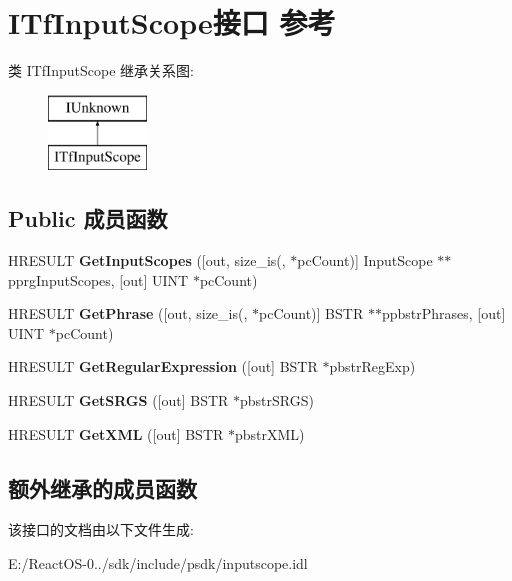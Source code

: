 \hypertarget{interface_i_tf_input_scope}{}\section{I\+Tf\+Input\+Scope接口 参考}
\label{interface_i_tf_input_scope}
类 I\+Tf\+Input\+Scope 继承关系图\+:\begin{figure}[H]
\begin{center}
\leavevmode
\includegraphics[height=2.000000cm]{interface_i_tf_input_scope}
\end{center}
\end{figure}
\subsection*{Public 成员函数}
\begin{DoxyCompactItemize}
\item 
\mbox{\label{interface_i_tf_input_scope_ad777bb9a64f50ede1b7e923455dd9a68}} 
H\+R\+E\+S\+U\+LT {\bfseries Get\+Input\+Scopes} (\mbox{[}out, size\+\_\+is(, $\ast$pc\+Count)\mbox{]} Input\+Scope $\ast$$\ast$pprg\+Input\+Scopes, \mbox{[}out\mbox{]} U\+I\+NT $\ast$pc\+Count)
\item 
\mbox{\label{interface_i_tf_input_scope_a289c68a7cc541294b43d8c1a797daa0d}} 
H\+R\+E\+S\+U\+LT {\bfseries Get\+Phrase} (\mbox{[}out, size\+\_\+is(, $\ast$pc\+Count)\mbox{]} B\+S\+TR $\ast$$\ast$ppbstr\+Phrases, \mbox{[}out\mbox{]} U\+I\+NT $\ast$pc\+Count)
\item 
\mbox{\label{interface_i_tf_input_scope_a52122487c0064f128c8d157483ec53ea}} 
H\+R\+E\+S\+U\+LT {\bfseries Get\+Regular\+Expression} (\mbox{[}out\mbox{]} B\+S\+TR $\ast$pbstr\+Reg\+Exp)
\item 
\mbox{\label{interface_i_tf_input_scope_a2d5e9d0eebd5d4d9d8145f3f68cc11ee}} 
H\+R\+E\+S\+U\+LT {\bfseries Get\+S\+R\+GS} (\mbox{[}out\mbox{]} B\+S\+TR $\ast$pbstr\+S\+R\+GS)
\item 
\mbox{\label{interface_i_tf_input_scope_ae76393f6ae4704ae9c658cf14b8d6ff8}} 
H\+R\+E\+S\+U\+LT {\bfseries Get\+X\+ML} (\mbox{[}out\mbox{]} B\+S\+TR $\ast$pbstr\+X\+ML)
\end{DoxyCompactItemize}
\subsection*{额外继承的成员函数}


该接口的文档由以下文件生成\+:\begin{DoxyCompactItemize}
\item 
E\+:/\+React\+O\+S-\/0../sdk/include/psdk/inputscope.\+idl\end{DoxyCompactItemize}
